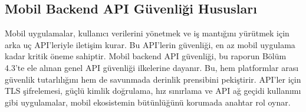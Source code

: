 \subsection{Mobil Backend API Güvenliği Hususları}

Mobil uygulamalar, kullanıcı verilerini yönetmek ve iş mantığını yürütmek için arka uç API'leriyle iletişim kurar. Bu API'lerin güvenliği, en az mobil uygulama kadar kritik öneme sahiptir. Mobil backend API güvenliği, bu raporun Bölüm 4.3'te ele alınan genel API güvenliği ilkelerine dayanır. Bu, hem platformlar arası güvenlik tutarlılığını hem de savunmada derinlik prensibini pekiştirir. API'ler için TLS şifrelemesi, güçlü kimlik doğrulama, hız sınırlama ve API ağ geçidi kullanımı gibi uygulamalar, mobil ekosistemin bütünlüğünü korumada anahtar rol oynar.



